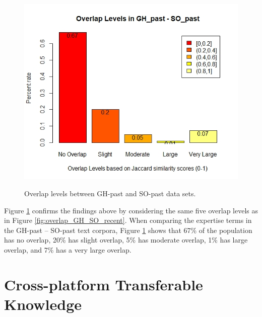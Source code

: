         \begin{figure}
          \centering
          \includegraphics[width=\textwidth]{figures/overlap_SO_GH_past.jpeg}\\
          \caption{Overlap levels between GH-past and SO-past data sets.}
          \label{fig:overlap_GH_SO_past}
        \end{figure}
        
        Figure \ref{fig:overlap_GH_SO_past} confirms the findings above by considering the same five overlap levels as in Figure \ref{fig:overlap_GH_SO_recent}. When comparing the expertise terms in the GH-past -- SO-past text corpora, Figure \ref{fig:overlap_GH_SO_past} shows that 67\% of the population has no overlap, 20\% has slight overlap, 5\% has moderate overlap, 1\% has large overlap, and 7\% has a very large overlap. \\
        
    
    \section{Cross-platform Transferable Knowledge\label{sec:results_rq3}}
        
